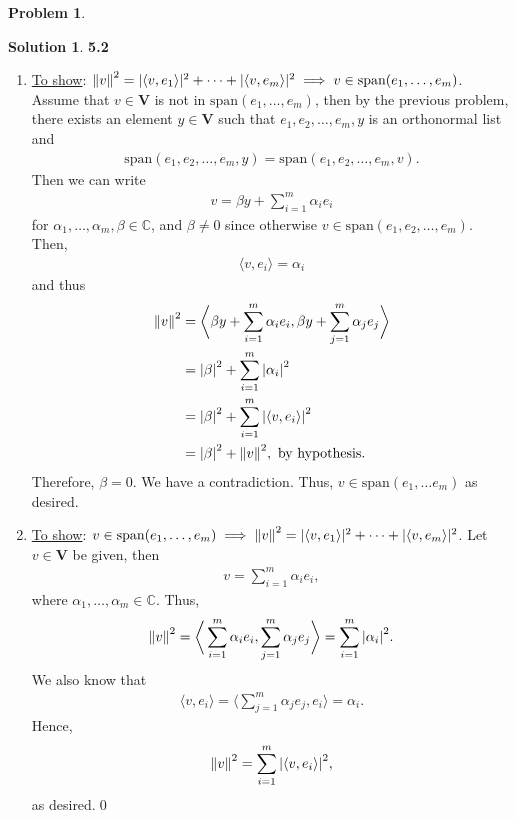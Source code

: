 \documentclass{book}
\theoremstyle{definition}
\newtheorem*{prob*}{Problem}
\newtheorem*{sln*}{Solution}
\newcommand{\V}{\mathbf{V}}
\newcommand{\xpan}{\text{span}}
\newcommand{\la}{\langle}
\newcommand{\ra}{\rangle}
\begin{document}
\begin{prob*}
\begin{enumerate}
		\begin{sln*}\textbf{5.2}
			\begin{enumerate}
				\item \underline{To show}: $\norm{v}^2= \vert \la v, e_1 \ra \vert^2 + \dots + \vert \la v, e_m \ra \vert^2 \implies v\in \xpan(e_1,\dots,e_m)$. Assume that $v\in\V$ is not in $\xpan(e_1,\dots,e_m)$, then by the previous problem, there exists an element $y\in \V$ such that $e_1,e_2,\dots,e_m,y$ is an orthonormal list and 
				\begin{align*}
				\xpan(e_1,e_2,\dots,e_m,y) = \xpan(e_1,e_2,\dots,e_m,v). 
				\end{align*}
				Then we can write
				\begin{align*}
				v = \beta y + \sum^m_{i=1}\alpha_i e_i 
				\end{align*}
				for $\alpha_1,\dots,\alpha_m, \beta \in \mathbb{C}$, and $\beta \neq 0$ since otherwise $v\in \xpan(e_1,e_2,\dots,e_m)$. Then,
				\begin{align*}
				\la v,e_i \ra = \alpha_i
				\end{align*}
				and thus
				\begin{align*}
				\norm{v}^2 &= \bigg\la \beta y + \sum^m_{i=1}\alpha_i e_i ,\beta y + \sum^m_{j=1}\alpha_j e_j   \bigg\ra\\
				&= \abs{\beta}^2 + \sum^m_{i=1}\abs{\alpha_i}^2\\
				&= \abs{\beta}^2 + \sum^m_{i=1}\abs{\la v,e_i \ra}^2\\
				&= \abs{\beta}^2 + \norm{v}^2, \text{ by hypothesis.}
				\end{align*}
				Therefore, $\beta = 0$. We have a contradiction. Thus, $v\in \xpan(e_1, \dots e_m)$ as desired.
				
				
				
				\item \underline{To show}: $v\in \xpan(e_1,\dots,e_m) \implies \norm{v}^2= \vert \la v, e_1 \ra \vert^2 + \dots + \vert \la v, e_m \ra \vert^2$. Let $v\in \V$ be given, then
				\begin{align*}
				v = \sum^m_{i=1}\alpha_i e_i,
				\end{align*}
				where $\alpha_1,\dots,\alpha_m \in \mathbb{C}$. Thus,
				\begin{align*}
				\norm{v}^2 = \bigg\la \sum^m_{i=1}\alpha_i e_i, \sum^m_{j=1}\alpha_j e_j \bigg\ra = \sum^m_{i=1}\abs{\alpha_i}^2.
				\end{align*}
				We also know that
				\begin{align*}
				\la v, e_i \ra = \bigg\la \sum^m_{j=1}\alpha_j e_j , e_i\bigg\ra = \alpha_i.
				\end{align*}
				Hence, 
				\begin{align*}
				\norm{v}^2 = \sum^m_{i=1}\abs{\la v, e_i \ra}^2,
				\end{align*}
				as desired.\qed
				
				
				
			\end{enumerate}
		\end{sln*}
	\end{enumerate}
\end{prob*}
\end{document}
